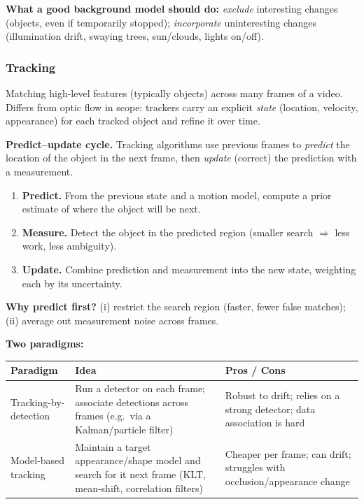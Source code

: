 \textbf{What a good background model should do:} \emph{exclude} interesting changes (objects, even if temporarily stopped); \emph{incorporate} uninteresting changes (illumination drift, swaying trees, sun/clouds, lights on/off).

\bigseparator

\subsubsection{Tracking}

\begin{defbox}[Tracking]
Matching high-level features (typically objects) across many frames of a video. Differs from optic flow in scope: trackers carry an explicit \emph{state} (location, velocity, appearance) for each tracked object and refine it over time.
\end{defbox}

\textbf{Predict--update cycle.} Tracking algorithms use previous frames to \emph{predict} the location of the object in the next frame, then \emph{update} (correct) the prediction with a measurement.
\begin{enumerate}
  \item \textbf{Predict.} From the previous state and a motion model, compute a prior estimate of where the object will be next.
  \item \textbf{Measure.} Detect the object in the predicted region (smaller search $\Rightarrow$ less work, less ambiguity).
  \item \textbf{Update.} Combine prediction and measurement into the new state, weighting each by its uncertainty.
\end{enumerate}
\textbf{Why predict first?} (i) restrict the search region (faster, fewer false matches); (ii) average out measurement noise across frames.

\separator

\textbf{Two paradigms:}

\begin{center}
\renewcommand{\arraystretch}{1.3}
\begin{tabular}{@{} l p{5.5cm} p{4.8cm} @{}}
\toprule
\textbf{Paradigm} & \textbf{Idea} & \textbf{Pros / Cons} \\
\midrule
Tracking-by-detection & Run a detector on each frame; associate detections across frames (e.g.\ via a Kalman/particle filter) & Robust to drift; relies on a strong detector; data association is hard \\
Model-based tracking & Maintain a target appearance/shape model and search for it next frame (KLT, mean-shift, correlation filters) & Cheaper per frame; can drift; struggles with occlusion/appearance change \\
\bottomrule
\end{tabular}
\end{center}

